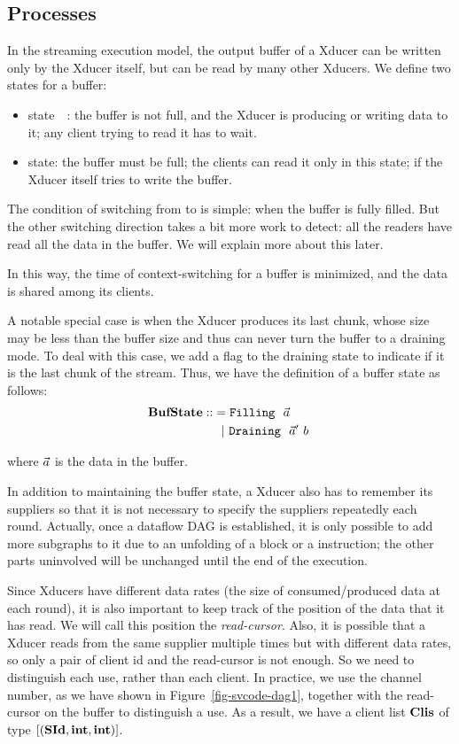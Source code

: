 \subsection{Processes}
In the streaming execution model, the output buffer of a Xducer can be written only by the Xducer itself, but can be read by many other Xducers. 
We define two states for a buffer:
\begin{itemize}
	\item \filling state　: the buffer is not full, and the Xducer is producing or writing data to it; any client trying to read it has to wait.

	\item \draining state: the buffer must be full; the clients can read it only in this state; if the Xducer itself tries to write the buffer.
\end{itemize}

The condition of switching from \filling to \draining is simple: when the buffer is fully filled. 
But the other switching direction takes a bit more work to detect: all the readers have read all the data in the buffer. We will explain more about this later.

In this way, the time of context-switching for a buffer is minimized, and the data is shared among its clients.


A notable special case is when the Xducer produces its last chunk, whose size may be less than the buffer size and thus can never turn the buffer to a draining mode.
To deal with this case, we add a flag to the draining state to indicate if it is the last chunk of the stream. 
Thus, we have the definition of a buffer state as follows:
\begin{align*}
	\mathbf{BufState} :: & = \texttt{Filling} \  \ \vec a \\
	          & \ \ | \ \texttt{Draining} \  \ \vec a' \ b \
\end{align*}

where $\vec a$ is the data in the buffer.

In addition to maintaining the buffer state, a Xducer also has to remember its suppliers so that it is not necessary to specify the suppliers repeatedly each round. 
Actually, once a dataflow DAG is established, it is only possible to add more subgraphs to it due to an unfolding of a \wc block or a \sc instruction; the other parts uninvolved will be unchanged until the end of the execution.


Since Xducers have different data rates (the size of consumed/produced data at each round), it is also important to keep track of the position of the data that it has read.
We will call this position the \emph{read-cursor}.
Also, it is possible that a Xducer reads from the same supplier multiple times but with different data rates, so only a pair of client id and the read-cursor is not enough.
So  we need  to distinguish each use, rather than each client. 
In practice, we use the channel number, as we have shown in Figure~\ref{fig-svcode-dag1}, together with the read-cursor on the buffer to distinguish a use.
As a result, we have a client list $\mathbf{Clis}$ of type $[(\mathbf{SId}, \mathbf{int}, \mathbf{int})]$.

